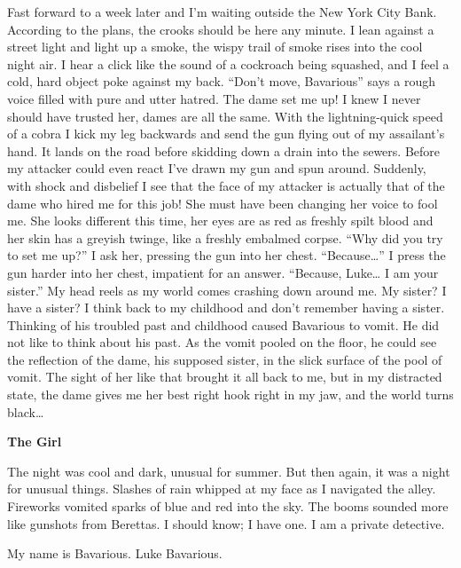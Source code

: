 Fast forward to a week later and I'm waiting outside the New York
City Bank. According to the plans, the crooks should be here any
minute. I lean against a street light and light up a smoke, the
wispy trail of smoke rises into the cool night air. I hear a click
like the sound of a cockroach being squashed, and I feel a cold,
hard object poke against my back. ``Don't move, Bavarious'' says a
rough voice filled with pure and utter hatred. The dame set me up!
I knew I never should have trusted her, dames are all the same.
With the lightning-quick speed of a cobra I kick my leg backwards
and send the gun flying out of my assailant's hand. It lands on the
road before skidding down a drain into the sewers. Before my
attacker could even react I've drawn my gun and spun around.
Suddenly, with shock and disbelief I see that the face of my
attacker is actually that of the dame who hired me for this job!
She must have been changing her voice to fool me. She looks
different this time, her eyes are as red as freshly spilt blood and
her skin has a greyish twinge, like a freshly embalmed corpse. ``Why
did you try to set me up?'' I ask her, pressing the gun into her
chest. ``Because{\ldots}'' I press the gun harder into her chest,
impatient for an answer. ``Because, Luke{\ldots} I am your sister.'' My
head reels as my world comes crashing down around me. My sister? I
have a sister? I think back to my childhood and don't remember
having a sister. Thinking of his troubled past and childhood caused
Bavarious to vomit. He did not like to think about his past. As the
vomit pooled on the floor, he could see the reflection of the dame,
his supposed sister, in the slick surface of the pool of vomit. The
sight of her like that brought it all back to me, but in my
distracted state, the dame gives me her best right hook right in my
jaw, and the world turns black{\ldots} 
 





{\bf The Girl}



The night was cool and dark, unusual for summer. But then again, it
was a night for unusual things. Slashes of rain whipped at my face
as I navigated the alley. Fireworks vomited sparks of blue and red
into the sky. The booms sounded more like gunshots from Berettas. I
should know; I have one. I am a private detective.



My name is Bavarious. Luke Bavarious.




